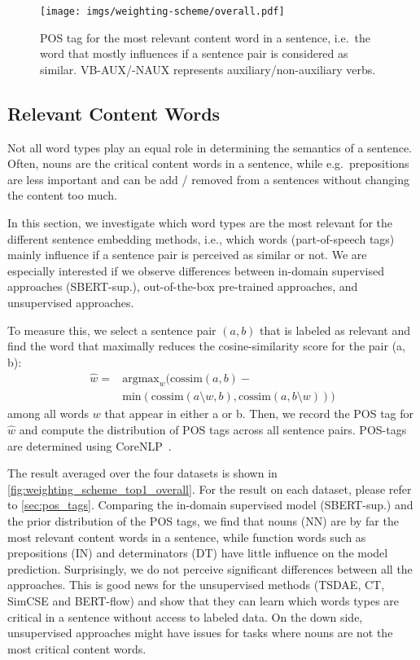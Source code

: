 \documentclass[11pt]{article}
\begin{document}
\begin{figure}[t]
  \centering
  \texttt{[image: imgs/weighting-scheme/overall.pdf]}
  \caption{POS tag for the most relevant content word in a sentence, i.e.\ the word that mostly influences if a sentence pair is considered as similar. VB-AUX/-NAUX represents auxiliary/non-auxiliary verbs.}
  \label{fig:weighting_scheme_top1_overall}
\end{figure}



\subsection{Relevant Content Words}

Not all word types play an equal role in determining the semantics of a sentence. Often, nouns are the critical content words in a sentence, while e.g.\ prepositions are less important and can be add / removed from a sentences without changing the content too much.

In this section, we investigate which word types are the most relevant for the different sentence embedding methods, i.e., which words (part-of-speech tags) mainly influence if a sentence pair is perceived as similar or not. We are especially interested if we observe differences between in-domain supervised approaches (SBERT-sup.), out-of-the-box pre-trained approaches, and unsupervised approaches.  

To measure this, we select a sentence pair $(a, b)$ that is labeled as relevant and find the word that maximally reduces the cosine-similarity score for the pair (a, b):
\begin{align*}
\hat w = &\text{argmax}_w\big(\text{cossim}(a, b)-\\ &\text{min}(\text{cossim}(a\setminus w, b), \text{cossim}(a, b\setminus w))\big)
\end{align*}
among all words $w$ that appear in either a or b. Then, we record the POS tag for $\hat w$ and compute the distribution of POS tags across all sentence pairs. POS-tags are determined using CoreNLP~\citep{manning-etal-2014-stanford}.

The result averaged over the four datasets is shown in \autoref{fig:weighting_scheme_top1_overall}. For the result on each dataset, please refer to \autoref{sec:pos_tags}. Comparing the in-domain supervised model (SBERT-sup.) and the prior distribution of the POS tags, we find that nouns (NN) are by far the most relevant content words in a sentence, while function words such as prepositions (IN) and determinators (DT) have little influence on the model prediction. Surprisingly, we do not perceive significant differences between all the approaches. This is good news for the unsupervised methods (TSDAE, CT, SimCSE and BERT-flow) and show that they can learn which words types are critical in a sentence without access to labeled data. On the down side, unsupervised approaches might have issues for tasks where nouns are not the most critical content words.
\end{document}
